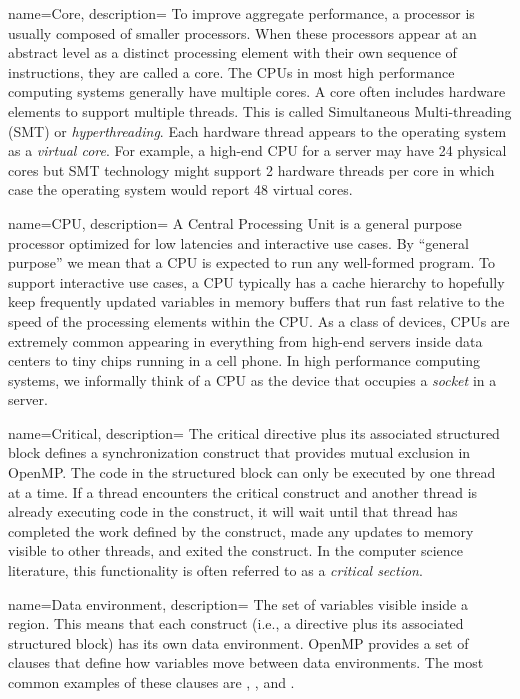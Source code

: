 {
   name={Core},
   description={
   To improve aggregate performance, a processor is usually composed of smaller processors.  When these processors
   appear at an abstract level as a distinct processing element with their own sequence of instructions, they are called a core.
   The CPUs in most high performance computing systems generally have multiple cores.  A core often includes hardware 
   elements to support multiple threads.  This is called Simultaneous Multi-threading (SMT) or \emph{hyperthreading}.  Each
   hardware thread appears to the operating system as a \emph{virtual core}.  For example, a high-end CPU for a server 
   may have 24 physical cores but SMT technology might support 2 hardware threads per core  in which case the operating
   system would report 48 virtual cores.
   }
} 

{
   name={CPU},
   description={
   A Central Processing Unit is a general purpose processor optimized for low latencies and interactive use cases.  By 
   ``general purpose'' we mean that a CPU is expected to run any well-formed program. To support interactive use cases, a
   CPU typically has a cache hierarchy to hopefully keep frequently updated variables in memory buffers that run fast relative
   to the speed of the processing elements within the CPU.  As a class of devices, CPUs are extremely common appearing in everything
   from high-end servers inside data centers to tiny chips running in a cell phone.  In high performance computing systems, we
   informally think of a CPU as the device that occupies a \emph{socket} in a server.
   }
}  

{
   name={Critical},
   description={
   The critical directive plus its associated structured block defines a synchronization 
   construct that provides mutual exclusion in OpenMP.  The code
   in the structured block can only be executed by one thread at a time.  If a thread encounters the critical construct
   and another thread is already executing code in the construct, it will wait until that thread has completed
   the work defined by the construct, made any updates to memory visible to other threads, and exited the construct. 
   In the computer science literature, this functionality is often referred to as a \emph{critical section}.
   }
}   
 

{
   name={Data environment},
   description={
    The set of variables visible inside a region.  This means that each construct (i.e., a directive plus its associated
    structured block) has its own data environment.  OpenMP provides a set of clauses that define how variables move
    between data environments.  The most common examples of these clauses are , ,
    and .
    }
}

